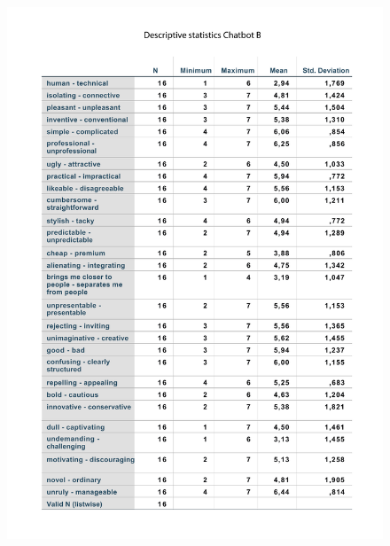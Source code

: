     \begin{figure}
        \centering
        \includegraphics[scale=0.7]{figures/DescriptiveChatbotB.pdf}
        \label{fig:deschatB}
    \end{figure}


